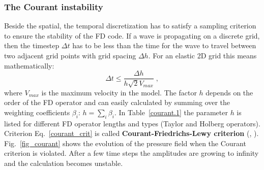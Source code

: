 \subsubsection{The Courant instability}
\label{courant}
Beside the spatial, the temporal discretization has to satisfy a sampling criterion to ensure the stability of the FD code. If a 
wave is propagating on a discrete grid, then the timestep $\Delta t$ has to be less than the time for the wave to travel between two adjacent grid 
points with grid spacing $\Delta h$. For an elastic 2D grid this means mathematically:
\begin{equation}
    \Delta t \le \frac{\Delta h}{h \sqrt{2} V_{max}}\;,
    \label{courant_crit}
\end{equation}
where $V_{max}$ is the maximum velocity in the model. The factor $h$ depends on the order of the FD operator and can easily calculated by summing over the weighting coefficients $\beta_i$: $h = \sum_i \beta_i$. In Table~\ref{courant.1} the parameter $h$ is listed for different FD operator lengths and types (Taylor and Holberg operators). Criterion Eq.~\ref{courant_crit} is called {\textbf{Courant-Friedrichs-Lewy criterion}} (\cite{courant:28}, \cite{courant:67}). 
Fig.~\ref{fig_courant} shows the evolution of the pressure field when the Courant criterion is violated. After a few time steps the amplitudes are growing to infinity and the calculation becomes unstable.

